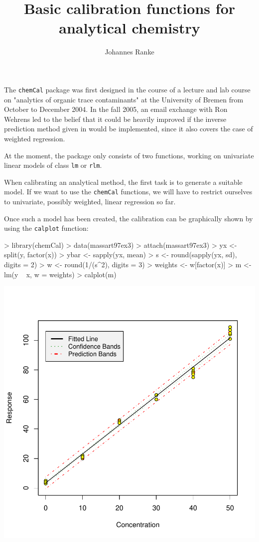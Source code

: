 \documentclass[a4paper]{article}
\title{Basic calibration functions for analytical chemistry}
\author{Johannes Ranke}
\newcommand{\chemCal}{{\tt chemCal}}
\begin{document}
\maketitle

The \chemCal{} package was first designed in the course of a lecture and lab
course on "analytics of organic trace contaminants" at the University of Bremen
from October to December 2004. In the fall 2005, an email exchange with 
Ron Wehrens led to the belief that it could be heavily improved if the
inverse prediction method given in \cite{massart97} would be implemented,
since it also covers the case of weighted regression.

At the moment, the package only consists of two functions, working
on univariate linear models of class \texttt{lm} or \texttt{rlm}.

When calibrating an analytical method, the first task is to generate
a suitable model. If we want to use the \chemCal{} functions, we
will have to restrict ourselves to univariate, possibly weighted, linear
regression so far.

Once such a model has been created, the calibration can be graphically
shown by using the \texttt{calplot} function:

\begin{Schunk}
\begin{Sinput}
> library(chemCal)
> data(massart97ex3)
> attach(massart97ex3)
> yx <- split(y, factor(x))
> ybar <- sapply(yx, mean)
> s <- round(sapply(yx, sd), digits = 2)
> w <- round(1/(s^2), digits = 3)
> weights <- w[factor(x)]
> m <- lm(y ~ x, w = weights)
> calplot(m)
\end{Sinput}
\end{Schunk}
\includegraphics{chemCal-001}
\end{document}
